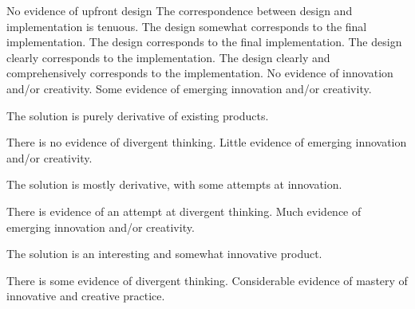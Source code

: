 \documentclass{../fal_assignment}
\begin{document}
\begin{markingrubric}
%
        \grade\fail No evidence of upfront design
        \grade The correspondence between design and implementation is tenuous.
        \grade The design somewhat corresponds to the final implementation.
        \grade The design corresponds to the final implementation.
        \grade The design clearly corresponds to the implementation.
        \grade The design clearly and comprehensively corresponds to the implementation.
%
        \grade\fail No evidence of innovation and/or creativity.
        \grade Some evidence of emerging innovation and/or creativity.
            \par The solution is purely derivative of existing products.
            \par There is no evidence of divergent thinking.
        \grade Little evidence of emerging innovation and/or creativity.
            \par The solution is mostly derivative, with some attempts at innovation.
            \par There is evidence of an attempt at divergent thinking.
        \grade Much evidence of emerging innovation and/or creativity.
            \par The solution is an interesting and somewhat innovative product.
            \par There is some evidence of divergent thinking.
        \grade Considerable evidence of mastery of innovative and creative practice.

\end{markingrubric}
\end{document}
